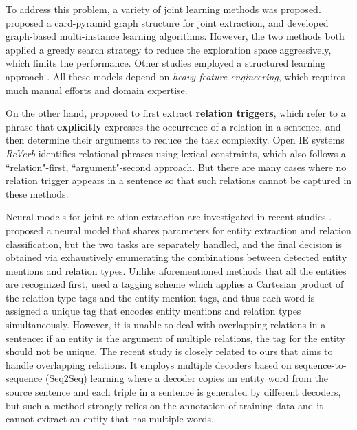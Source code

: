 \documentclass[letterpaper]{article} %
\theoremstyle{definition}
\begin{document}
To address this problem, a variety of joint learning methods was proposed. \citeauthor{kate2010joint}  proposed a card-pyramid graph structure for joint extraction, and \citeauthor{hoffmann2011knowledge}  developed graph-based multi-instance learning algorithms. However, the two methods both applied a greedy search strategy to reduce the exploration space aggressively, which limits the performance. Other studies employed a structured learning approach \cite{li2014incremental,miwa2014modeling}. All these models depend on \textit{heavy feature engineering}, which requires much manual efforts and domain expertise. %

On the other hand, \citeauthor{bjorne2011extracting}  proposed to first extract \textbf{relation triggers}, which refer to a phrase that \textbf{explicitly} expresses the occurrence of a relation in a sentence, and then determine their arguments to reduce the task complexity. Open IE systems \textit{ReVerb} \cite{fader2011identifying} identifies relational phrases using lexical constraints, which also follows a ``relation"-first, ``argument"-second approach. But there are many cases where no relation trigger appears in a sentence so that such relations cannot be captured in these methods. 

Neural models for joint relation extraction are investigated in recent studies \cite{katiyar2016investigating,zhang2017end}. \citeauthor{miwa2016end}  proposed a neural model that shares parameters for entity extraction and relation classification, but the two tasks are separately handled, and the final decision is obtained via exhaustively enumerating the combinations between detected entity mentions and relation types. Unlike aforementioned methods that all the entities are recognized first, \citeauthor{zheng2017joint}  used a tagging scheme which applies a Cartesian product of the relation type tags and the entity mention tags, and thus each word is assigned a unique tag that encodes entity mentions and relation types simultaneously. However, it is unable to deal with overlapping relations in a sentence: if an entity is the argument of multiple relations, the tag for the entity should not be unique.  
The recent study \cite{zeng2018extracting} is closely related to ours that aims to handle overlapping relations. It employs multiple decoders based on sequence-to-sequence (Seq2Seq) learning where a decoder copies an entity word from the source sentence and each triple in a sentence is generated by different decoders, but such a method strongly relies on the annotation of training data and it cannot extract an entity that has multiple words.
\end{document}
